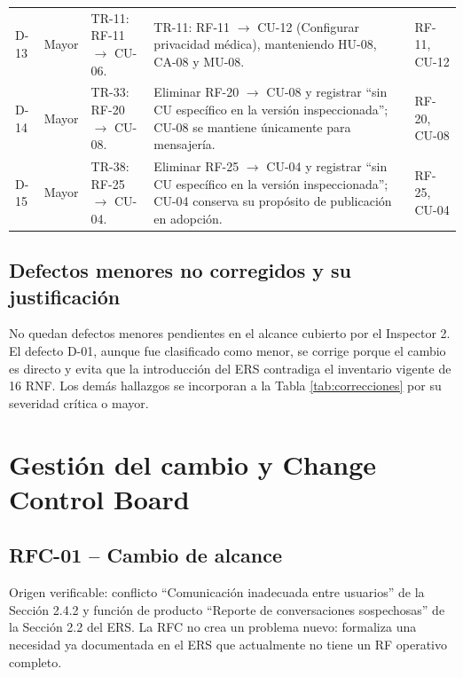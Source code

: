 \documentclass[journal,onecolumn]{IEEEtran}
\begin{document}
\begin{longtable}{C{1.2cm} L{1.7cm} L{4.5cm} L{4.5cm} L{1.5cm}}
		\addlinespace
		D-13 & Mayor & TR-11: RF-11 $\rightarrow$ CU-06. &
		TR-11: RF-11 $\rightarrow$ CU-12 (Configurar privacidad médica), manteniendo HU-08, CA-08 y
		MU-08. & RF-11, CU-12 \\
		\addlinespace
		D-14 & Mayor & TR-33: RF-20 $\rightarrow$ CU-08. &
		Eliminar RF-20 $\rightarrow$ CU-08 y registrar ``sin CU específico en la versión
		inspeccionada''; CU-08 se mantiene únicamente para mensajería. & RF-20, CU-08 \\
		\addlinespace
		D-15 & Mayor & TR-38: RF-25 $\rightarrow$ CU-04. &
		Eliminar RF-25 $\rightarrow$ CU-04 y registrar ``sin CU específico en la versión
		inspeccionada''; CU-04 conserva su propósito de publicación en adopción. & RF-25, CU-04 \\
	\end{longtable}
	
	\subsection{Defectos menores no corregidos y su justificación}
	
	No quedan defectos menores pendientes en el alcance cubierto por el Inspector 2. El defecto D-01,
	aunque fue clasificado como menor, se corrige porque el cambio es directo y evita que la
	introducción del ERS contradiga el inventario vigente de 16 RNF. Los demás hallazgos se incorporan
	a la Tabla \ref{tab:correcciones} por su severidad crítica o mayor.
	\newpage
	\section{Gestión del cambio y Change Control Board}
	\label{sec:ccb}
	
	\subsection{RFC-01 -- Cambio de alcance}
	
	Origen verificable: conflicto ``Comunicación inadecuada entre usuarios'' de la Sección 2.4.2 y
	función de producto ``Reporte de conversaciones sospechosas'' de la Sección 2.2 del ERS. La RFC no
	crea un problema nuevo: formaliza una necesidad ya documentada en el ERS que actualmente no tiene
	un RF operativo completo.
	
\end{document}
